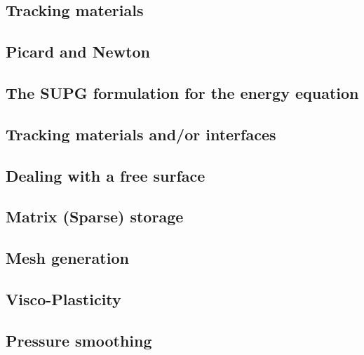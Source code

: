 \documentclass[a4paper]{article}
\begin{document}
\subsection{Tracking materials}

\subsection{Picard and Newton}


\subsection{The SUPG formulation for the energy equation}

\subsection{Tracking materials and/or interfaces}

\subsection{Dealing with a free surface}

\newpage %
\subsection{Matrix (Sparse) storage}  %

\newpage %
\subsection{Mesh generation} \label{subsection_meshes}  %

\newpage %
\subsection{Visco-Plasticity}  %

\newpage %
\subsection{Pressure smoothing}  %
\end{document}
